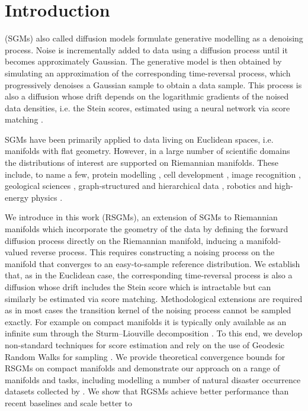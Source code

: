 
\section{Introduction}
\label{sec:introduction-rsgm}
 (SGMs) also called diffusion models \parencite{song2019generative,song2020score,ho2020denoising,nichol2021beatgans} formulate generative modelling as a denoising process.
Noise is incrementally added to data using a diffusion process until it becomes approximately Gaussian.
The generative model is then obtained by simulating an approximation of the corresponding time-reversal process, which progressively denoises a Gaussian sample to obtain a data sample.
This process is also a diffusion whose drift depends on the logarithmic gradients of the noised data densities, i.e. the Stein scores, estimated using a neural network via score matching \parencite{hyvarinen05a,vincent2011connection}.

SGMs have been primarily applied to data living on Euclidean spaces, i.e. manifolds with flat geometry.
However, in a large number of scientific domains the distributions of interest are supported on Riemannian manifolds.
These include, to name a few, protein modelling \parencite{shapovalov2011smoothed}, cell development \parencite{klimovskaia2020poincare}, image recognition \parencite{lui2012advances}, geological sciences \parencite{karpatne2018machine,peel2001fitting}, graph-structured and hierarchical data \parencite{roy2007learning,steyvers2005large}, robotics \parencite{feiten2013rigid,senanayake2018directional} and high-energy physics \parencite{brehmer2020flows}.

We introduce in this work  (RSGMs), an extension of SGMs to Riemannian manifolds which incorporate the geometry of the data by defining the forward diffusion process directly on the Riemannian manifold, inducing a manifold-valued reverse process.
This requires constructing a noising process on the manifold that converges to an easy-to-sample reference distribution.
We establish that, as in the Euclidean case, the corresponding time-reversal process is also a diffusion whose drift includes the Stein score which is intractable but can similarly be estimated via score matching.
Methodological extensions are required as in most cases the transition kernel of the noising process cannot be sampled exactly.
For example on compact manifolds it is typically only available as an infinite sum through the Sturm--Liouville decomposition \parencite{chavel1984eigenvalues}.
To this end, we develop non-standard techniques for score estimation and rely on the use of Geodesic Random Walks for sampling \parencite{jorgensen1975central}.
We provide theoretical convergence bounds for RSGMs on compact manifolds and demonstrate our approach on a range of manifolds and tasks, including modelling a number of natural disaster occurrence datasets collected by \textcite{mathieu2020riemannian}.
We show that RGSMs achieve better performance than recent baselines \parencite{mathieu2020riemannian,rozen2021moser} and scale better to

